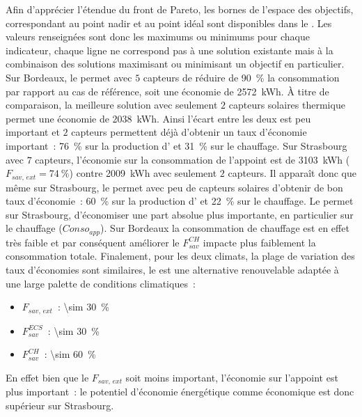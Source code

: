 Afin d’apprécier l’étendue du front de Pareto, les bornes de l’espace des objectifs,
correspondant au point nadir et au point idéal sont disponibles dans le
 . Les valeurs renseignées sont donc les maximums ou
minimums pour chaque indicateur, chaque ligne ne correspond pas à une solution existante
mais à la combinaison des solutions maximisant ou minimisant un objectif en particulier.
Sur Bordeaux, le  permet avec $5$ capteurs de réduire de
\SI{90}{\percent} la consommation par rapport au cas de référence, soit une économie de
\SI{2572}{kWh}. À titre de comparaison, la meilleure solution avec
seulement $2$ capteurs solaires thermique permet une économie de \SI{2038}{kWh}. Ainsi
l’écart entre les deux est peu important et $2$ capteurs permettent déjà d’obtenir un taux
d’économie important~: \SI{76}{\percent} sur la production d’ et
\SI{31}{\percent} sur le chauffage. Sur Strasbourg avec $7$ capteurs, l’économie
sur la consommation de l’appoint  est de \SI{3103}{kWh} ($F_{sav,\, ext} = \SI{74}{\percent}$)
contre \SI{2009}{kWh} avec seulement $2$ capteurs. Il apparaît donc que même sur Strasbourg, le
 permet avec peu de capteurs solaires d’obtenir de bon taux d’économie~:
\SI{60}{\percent} sur la production d’ et \SI{22}{\percent} sur le chauffage.
Le  permet sur Strasbourg, d’économiser une part absolue plus importante, en
particulier sur le chauffage ($Conso_{app}$). Sur Bordeaux la consommation de chauffage
est en effet très faible et par conséquent améliorer le $F_{sav}^{CH}$ impacte plus
faiblement la consommation totale. Finalement, pour les deux climats, la plage de
variation des taux d’économies sont similaires, le  est une alternative
renouvelable adaptée à une large palette de conditions climatiques~:
\begin{itemize}
    \item $F_{sav,\, ext}$~: \SI{\sim 30}{\percent}
    \item $F_{sav}^{ECS}$~: \SI{\sim 30}{\percent}
    \item $F_{sav}^{CH}$~: \SI{\sim 60}{\percent}
\end{itemize}
En effet bien que le $F_{sav,\, ext}$ soit moins important, l’économie sur l’appoint
est plus important~: le potentiel d’économie énergétique comme économique est donc supérieur
sur Strasbourg.

